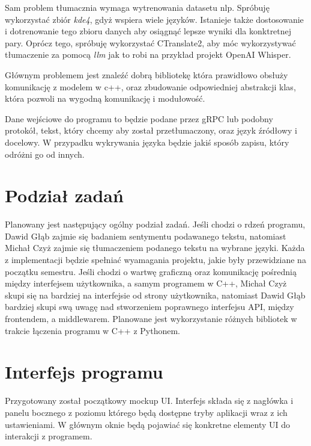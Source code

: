 \documentclass{article}
\begin{document}
Sam problem tłumacznia wymaga wytrenowania datasetu nlp. Spróbuję wykorzystać zbiór \textit{kde4}, gdyż wspiera wiele języków. Istanieje także dostosowanie i dotrenowanie tego zbioru danych aby osiągnąć lepsze wyniki dla konktretnej pary. Oprócz tego, spróbuję wykorzystać CTranslate2, aby móc wykorzystywać tłumaczenie za pomocą \textit{llm} jak to robi na przykład projekt OpenAI Whisper.

Głównym problemem jest znaleźć dobrą bibliotekę która prawidłowo obsłuży komunikację z modelem w c++, oraz zbudowanie odpowiedniej abstrakcji klas, która pozwoli na wygodną komunikację i modułowość. 

Dane wejściowe do programu to będzie podane przez gRPC lub podobny protokół, tekst, który chcemy aby został przetłumaczony, oraz język źródłowy i docelowy. W przypadku wykrywania języka będzie jakiś sposób zapisu, który odróżni go od innych. 

\section{Podział zadań}

Planowany jest następujący ogólny podział zadań. Jeśli chodzi o rdzeń programu, Dawid Głąb zajmie się badaniem sentymentu podawanego tekstu, natomiast Michał Czyż zajmie się tłumaczeniem podanego tekstu na wybrane języki. Każda z implementacji będzie spełniać wyamagania projektu, jakie były przewidziane na początku semestru. Jeśli chodzi o wartwę graficzną oraz komunikację pośrednią między interfejsem użytkownika, a samym programem w C++, Michał Czyż skupi się na bardziej na interfejsie od strony użytkownika, natomiast Dawid Głąb bardziej skupi swą uwagę nad stworzeniem poprawnego interfejsu API, między frontendem, a middlewarem. Planowane jest wykorzystanie różnych bibliotek w trakcie łączenia programu w C++ z Pythonem. 

\section{Interfejs programu}

Przygotowany został początkowy mockup UI. 
Interfejs składa się z nagłówka i panelu bocznego z poziomu którego będą dostępne tryby aplikacji wraz z ich ustawieniami. W głównym oknie będą pojawiać się konkretne elementy UI do interakcji z programem.
\end{document}
